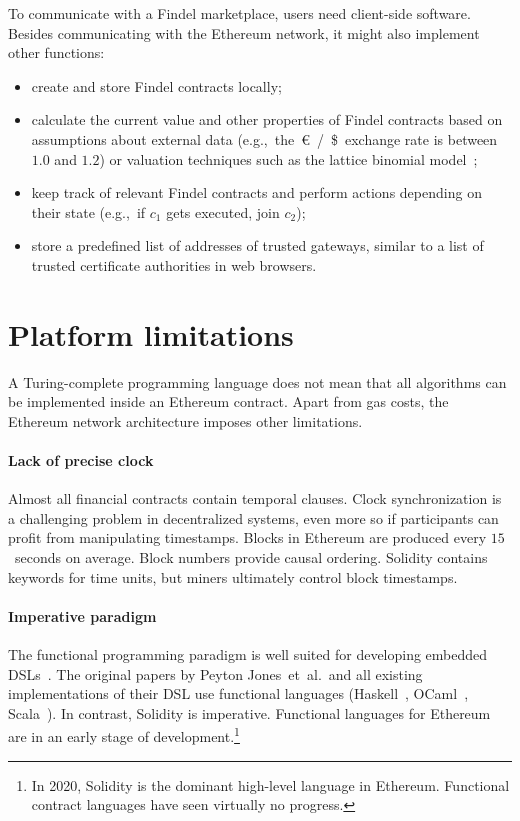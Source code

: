 To communicate with a Findel marketplace, users need client-side software.
Besides communicating with the Ethereum network, it might also implement other functions:
\begin{itemize}
	\item create and store Findel contracts locally;
	\item calculate the current value and other properties of Findel contracts based on assumptions about external data (e.g.,~the~\euro~/~\$~exchange rate is between $1.0$ and $1.2$) or valuation techniques such as the lattice binomial model~\cite{Cox1979};
	\item keep track of relevant Findel contracts and perform actions depending on their state (e.g.,~if \(c_1\) gets executed, join \(c_2\));
	\item store a predefined list of addresses of trusted gateways, similar to a list of trusted certificate authorities in web browsers.
\end{itemize}


\section{Platform limitations}

A Turing-complete programming language does not mean that all algorithms can be implemented inside an Ethereum contract.
Apart from gas costs, the Ethereum network architecture imposes other limitations.

\paragraph{Lack of precise clock}
Almost all financial contracts contain temporal clauses.
Clock synchronization is a challenging problem in decentralized systems, even more so if participants can profit from manipulating timestamps.
Blocks in Ethereum are produced every $15$~seconds on average.
Block numbers provide causal ordering.
Solidity contains keywords for time units, but miners ultimately control block timestamps.

\paragraph{Imperative paradigm}
The functional programming paradigm is well suited for developing embedded DSLs~\cite{Gibbons2015}.
The original papers by Peyton Jones~et~al.\ and all existing implementations of their DSL use functional languages (Haskell~\cite{PeytonJones2000, Jones2003, Straaten2007}, OCaml~\cite{LexiFi}, Scala~\cite{Walton2012, Chaudhary2015}).
In contrast, Solidity is imperative.
Functional languages for Ethereum~\cite{FpEthereum2017} are in an early stage of development.\footnote{In 2020, Solidity is the dominant high-level language in Ethereum. Functional contract languages have seen virtually no progress.}

